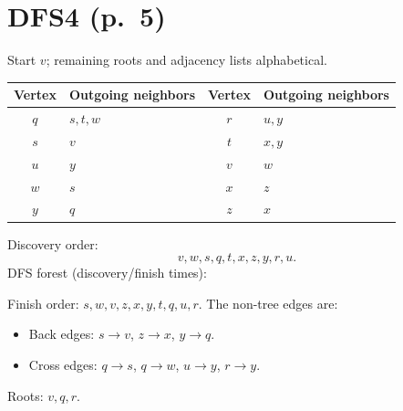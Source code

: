 \documentclass[11pt,a4paper]{article}
\newcommand{\question}[2]{\section*{#1}}
\begin{document}
\newpage
\question{DFS4 (p.\ 5)}{DFS starting from $v$}
Start $v$; remaining roots and adjacency lists alphabetical.
\begin{center}\begin{tabular}{c|l@{\qquad}c|l}\toprule
Vertex&Outgoing neighbors&Vertex&Outgoing neighbors\\\midrule
$q$&$s,t,w$&$r$&$u,y$\\$s$&$v$&$t$&$x,y$\\$u$&$y$&$v$&$w$\\$w$&$s$&$x$&$z$\\$y$&$q$&$z$&$x$\\\bottomrule\end{tabular}\end{center}
Discovery order:
\[
\boxed{v,w,s,q,t,x,z,y,r,u}.
\]
DFS forest (discovery/finish times):
\begin{center}\end{center}
Finish order: $s,w,v,z,x,y,t,q,u,r$. The non-tree edges are:
\begin{itemize}[nosep]
\item Back edges: $s\to v$, $z\to x$, $y\to q$.
\item Cross edges: $q\to s$, $q\to w$, $u\to y$, $r\to y$.
\end{itemize}
Roots: $v,q,r$.
\end{document}
